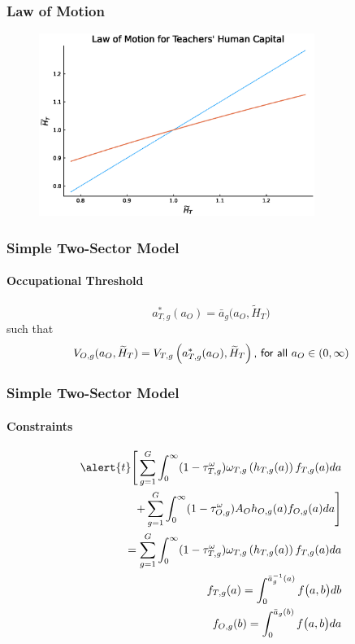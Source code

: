 \documentclass[11pt]{beamer}
\begin{document}
\begin{frame}
\frametitle{Law of Motion}
\begin{figure}
\begin{center}
\includegraphics[width=0.8\textwidth]{LoM.eps}
\label{ }
\end{center}
\end{figure}
\end{frame}

\begin{frame}
		\frametitle{Simple Two-Sector Model}
		\framesubtitle{Occupational Threshold}
        \label{thresh}
		\begin{equation*}
			a^*_{T,g}(a_O) = \bar{a}_g\big(a_{O},\widetilde{H}_T\big) %
		\end{equation*}
		such that
		\begin{equation}
			\label{eq:indiff}
			V_{O,g}(a_{O},\widetilde{H}_T) = V_{T,g}\left(a^*_{T,g}(a_O),\widetilde{H}_T\right) \textrm{{\sf , for all} } a_O \in (0,\infty) \nonumber
		\end{equation}
  \hyperlink{valuefn}{}
	\end{frame}
	
	\begin{frame}
		\frametitle{Simple Two-Sector Model}
		\framesubtitle{Constraints}
        \label{tax}
		\begin{align*}
			\alert{t}\Bigg[ \sum_{g=1}^G \int_0^\infty (1-\tau^{\omega}_{T,g})\omega_{T,g}\left(h_{T,g}(a)\right) f_{T,g}(a) da  \\
			+ \sum_{g=1}^G \int_0^\infty (1-\tau^{\omega}_{O,g})A_O h_{O,g}(a) f_{O,g}(a) da \Bigg]\\
			= \sum_{g=1}^G \int_0^\infty (1-\tau^{\omega}_{T,g})\omega_{T,g}\left(h_{T,g}(a)\right) f_{T,g}(a) da \\
			f_{T,g}(a)  = \int_0^{\bar{a}_g^{-1}\left(a\right)} f\big(a,b \big) db \\
			f_{O,g}(b)  = \int_0^{\bar{a}_g\left(b\right)} f\big(a,b \big) da 
		\end{align*}	
  \hyperlink{eqm}{}
	\end{frame}
\end{document}

